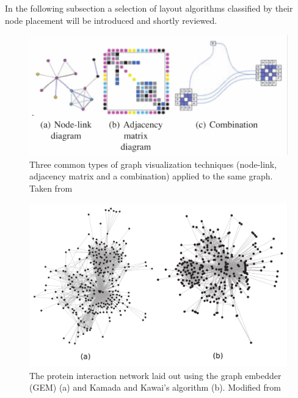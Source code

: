 In the following subsection a selection of layout algorithms classified by their node placement will be introduced and shortly reviewed.
\begin{figure}
    \centering
    \includegraphics[width=\linewidth]{media/vis_types.pdf}
    \caption{Three common types of graph visualization techniques (node-link, adjacency matrix and a combination) applied to the same graph. Taken from \cite{VonLandesberger2011}}
    \label{fig:vis_types}
\end{figure}

\begin{figure}
    \centering
    \includegraphics[scale=0.16]{media/layout_techniques.pdf}
    \caption{The protein interaction network laid out using the graph embedder (GEM) (a) and Kamada and Kawai's algorithm (b). Modified from \cite{Gibson2013}}
    \label{fig:layout_techniques}
\end{figure}
